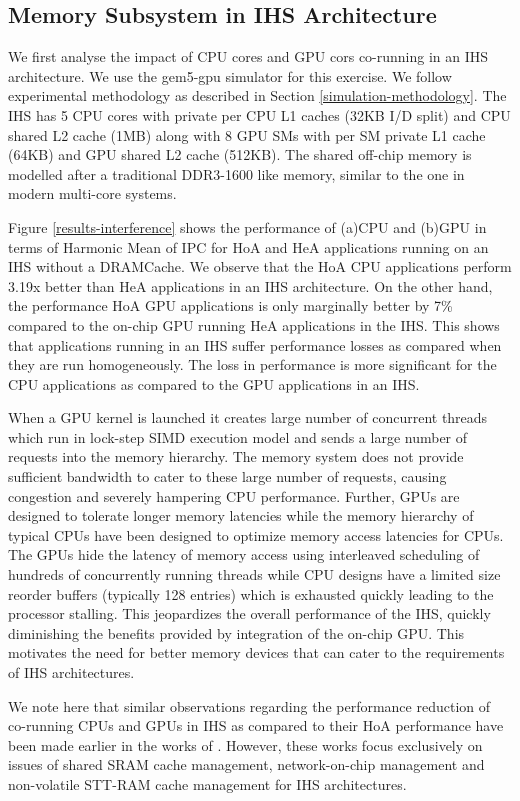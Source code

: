\subsection{Memory Subsystem in IHS Architecture}
We first analyse the impact of CPU cores and GPU cors co-running in an IHS architecture. 
We use the gem5-gpu \cite{gem5-gpu} simulator for this exercise. We follow experimental methodology as described in Section \ref{simulation-methodology}. The IHS has 5 CPU cores with private per CPU L1 caches (32KB I/D split) and CPU shared L2 cache (1MB) along with 8 GPU SMs with per SM private L1 cache (64KB) and GPU shared L2 cache (512KB).
The shared off-chip memory is modelled after a traditional DDR3-1600 like memory, similar to the one in modern multi-core systems. 
\par Figure \ref{results-interference} shows the performance of (a)CPU and (b)GPU in terms of Harmonic Mean of IPC for HoA and HeA applications running on an IHS without a DRAMCache. We observe that the HoA CPU applications perform 3.19x better than HeA applications in an IHS architecture. On the other hand, the performance HoA GPU applications is only marginally better by 7\% compared to the on-chip GPU running HeA applications in the IHS. This shows that applications running in an IHS suffer performance losses as compared when they are run homogeneously. The loss in performance is more significant for the CPU applications as compared to the GPU applications in an IHS. 
\par When a GPU kernel is launched it creates large number of concurrent threads which run in lock-step SIMD execution model and sends a large number of requests into the memory hierarchy. The memory system does not provide sufficient bandwidth to cater to these large number of requests, causing congestion and severely hampering CPU performance. Further, GPUs are designed to tolerate longer memory latencies while the memory hierarchy of typical CPUs have been designed to optimize memory access latencies for CPUs. The GPUs hide the latency of memory access using interleaved scheduling of hundreds of concurrently running threads while CPU designs have a limited size reorder buffers (typically 128 entries) which is exhausted quickly leading to the processor stalling. This jeopardizes the overall performance of the IHS, quickly diminishing the benefits provided by integration of the on-chip GPU. This motivates the need for better memory devices that can cater to the requirements of IHS architectures.
\par We note here that similar observations regarding the performance reduction of co-running CPUs and GPUs in IHS as compared to their HoA performance have been made earlier in the works of \cite{helm,oscar}. However, these works focus exclusively on issues of shared SRAM cache management, network-on-chip management and non-volatile STT-RAM cache management for IHS architectures.

